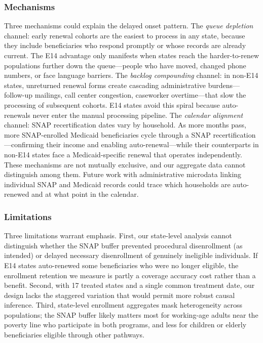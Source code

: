 \documentclass[12pt]{article}
\begin{document}
\subsubsection*{Mechanisms} Three mechanisms could explain the delayed onset pattern. The \emph{queue depletion} channel: early renewal cohorts are the easiest to process in any state, because they include beneficiaries who respond promptly or whose records are already current. The E14 advantage only manifests when states reach the harder-to-renew populations further down the queue---people who have moved, changed phone numbers, or face language barriers. The \emph{backlog compounding} channel: in non-E14 states, unreturned renewal forms create cascading administrative burdens---follow-up mailings, call center congestion, caseworker overtime---that slow the processing of subsequent cohorts. E14 states avoid this spiral because auto-renewals never enter the manual processing pipeline. The \emph{calendar alignment} channel: SNAP recertification dates vary by household. As more months pass, more SNAP-enrolled Medicaid beneficiaries cycle through a SNAP recertification---confirming their income and enabling auto-renewal---while their counterparts in non-E14 states face a Medicaid-specific renewal that operates independently. These mechanisms are not mutually exclusive, and our aggregate data cannot distinguish among them. Future work with administrative microdata linking individual SNAP and Medicaid records could trace which households are auto-renewed and at what point in the calendar.

\subsubsection*{Limitations} Three limitations warrant emphasis. First, our state-level analysis cannot distinguish whether the SNAP buffer prevented procedural disenrollment (as intended) or delayed necessary disenrollment of genuinely ineligible individuals. If E14 states auto-renewed some beneficiaries who were no longer eligible, the enrollment retention we measure is partly a coverage accuracy cost rather than a benefit. Second, with 17 treated states and a single common treatment date, our design lacks the staggered variation that would permit more robust causal inference. Third, state-level enrollment aggregates mask heterogeneity across populations; the SNAP buffer likely matters most for working-age adults near the poverty line who participate in both programs, and less for children or elderly beneficiaries eligible through other pathways.
\end{document}
